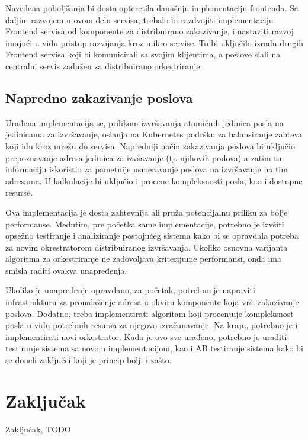 \documentclass[12pt,oneside]{memoir}
\begin{document}
Navedena poboljšanja bi dosta opteretila današnju implementaciju frontenda. Sa daljim razvojem u ovom delu servisa, trebalo bi razdvojiti implementaciju Frontend servisa od komponente za distribuirano zakazivanje, i nastaviti razvoj imajući u vidu pristup razvijanja kroz mikro-servise. To bi uključilo izradu drugih Frontend servisa koji bi komunicirali sa svojim klijentima, a poslove slali na centralni servis zadužen za distribuirano orkestriranje.

\subsection{Napredno zakazivanje poslova}

Urađena implementacija se, prilikom izvršavanja atomičnih jedinica posla na jedinicama za izvršavanje, oslanja na Kubernetes podršku za balansiranje zahteva koji idu kroz mrežu do servisa. Napredniji način zakazivanja poslova bi uključio prepoznavanje adresa jedinica za izvšavanje (tj. njihovih podova) a zatim tu informaciju iskoristio za pametnije usmeravanje poslova na izvršavanje na tim adresama. U kalkulacije bi uključio i procene kompleksnosti posla, kao i dostupne resurse.

Ova implementacija je dosta zahtevnija ali pruža potencijalnu priliku za bolje performanse. Međutim, pre početka same implementacije, potrebno je izvšiti opsežno testiranje i analiziranje postojućeg sistema kako bi se opravdala potreba za novim okrestratorom distribuiranog izvršavanja. Ukoliko osnovna varijanta algoritma za orkestriranje ne zadovoljava kriterijume performansi, onda ima smisla raditi ovakva unapređenja.

Ukoliko je unapređenje opravdano, za početak, potrebno je napraviti infrastrukturu za pronalaženje adresa u okviru komponente koja vrši zakazivanje poslova. Dodatno, treba implementirati algoritam koji procenjuje kompleksnost posla u vidu potrebnih resursa za njegovo izračunavanje. Na kraju, potrebno je i implementirati novi orkestrator. Kada je ovo sve urađeno, potrebno je uraditi testiranje sistema sa novom implementacijom, kao i AB testiranje sistema kako bi se doneli zaključci koji je princip bolji i zašto.


\section{Zaključak}
Zaključak, TODO

\literatura
\end{document}

